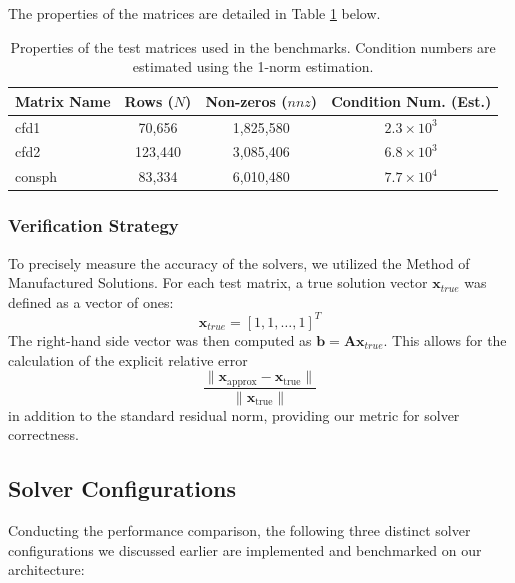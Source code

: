 \documentclass[a4paper,10.5pt,twoside]{article}
\begin{document}
The properties of the matrices are detailed in Table \ref{tab:matrices} below.

\begin{table}[h!]
    \centering
    \begin{tabular}{l c c c}
    \hline
    \textbf{Matrix Name} & \textbf{Rows ($N$)} & \textbf{Non-zeros ($nnz$)} & \textbf{Condition Num. (Est.)} \\
    \hline
    cfd1   & 70,656  & 1,825,580 & $2.3 \times 10^3$ \\
    cfd2   & 123,440 & 3,085,406 & $6.8 \times 10^3$ \\
    consph & 83,334  & 6,010,480 & $7.7 \times 10^4$ \\
    \hline
    \end{tabular}
    \caption{Properties of the test matrices used in the benchmarks. Condition numbers are estimated using the 1-norm estimation.}
    \label{tab:matrices}
\end{table}

\subsubsection{Verification Strategy}
To precisely measure the accuracy of the solvers, we utilized the Method of Manufactured Solutions. For each test matrix, a true solution vector $\mathbf{x}_{true}$ was defined as a vector of ones:
\[
\mathbf{x}_{true} = [1, 1, \dots, 1]^T
\]
The right-hand side vector was then computed as $\mathbf{b} = \mathbf{A}\mathbf{x}_{true}$. This allows for the calculation of the explicit relative error 
\[\frac{\|\mathbf{x}_{\text{approx}} - \mathbf{x}_{\text{true}}\|}{\|\mathbf{x}_{\text{true}}\|}\]
in addition to the standard residual norm, providing our metric for solver correctness.


\subsection{Solver Configurations}

Conducting the performance comparison, the following three distinct solver configurations we discussed earlier are implemented and benchmarked on our architecture:
\end{document}
